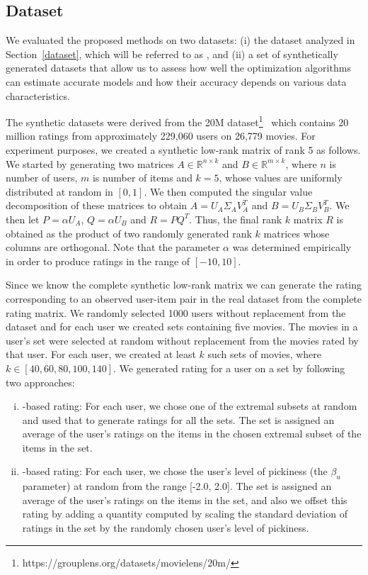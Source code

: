 
\subsection{Dataset}\label{EVALDATA}
We evaluated the proposed methods on two datasets: (i) the dataset analyzed in
Section~\ref{dataset}, which will be referred to as \MLREALSETS, and (ii) a set
of synthetically generated datasets that
allow us to assess how well
the optimization algorithms can estimate accurate models and how their
accuracy depends on various data characteristics.

The synthetic datasets were derived from the \ML
20M
dataset\footnote{https://grouplens.org/datasets/movielens/20m/}~\cite{harper2016movielens}  which
contains 20 million ratings from approximately 229,060 users on 26,779 movies.
For experiment purposes, we
created a synthetic low-rank matrix of rank 5 as follows. 
%
We started by generating two matrices
$A\in\mathbb{R}^{n\times k}$ and $B\in\mathbb{R}^{m\times k}$, where $n$ is
number of users, $m$ is number of items and $k = 5$, whose values are
uniformly distributed at random in $[0, 1]$. We then computed the singular value
decomposition of these matrices to obtain $A=U_A\Sigma_A V_A^T$ and $B=U_B\Sigma_B
V_B^T$. We then let $P=\alpha U_A$, $Q=\alpha U_B$ and $R = PQ^T$. Thus, the final
rank $k$ matrix $R$ is obtained as the product of two randomly generated rank $k$
matrices whose columns are orthogonal. Note that the parameter $\alpha$ was
determined empirically in order to produce ratings in the range of $[-10, 10]$.

Since we know the complete synthetic low-rank matrix we can generate the rating
corresponding to an observed user-item pair in the real dataset from the complete
rating matrix.
We randomly selected 1000 users without replacement from the dataset and for
each user we created sets containing five movies. 
The movies in a user's set
were selected at random without replacement from the movies rated by that user.
For each user, we created at least $k$ such sets of movies, where $k \in [40,
60, 80, 100, 140]$.
We generated rating for a user on a set by 
following two approaches: 
\begin{enumerate}[(i)]  
  \item \ES-based rating: For each user, we chose one of the
extremal subsets at random and used that to generate ratings for all the sets.
The set is assigned an average of the user's ratings on the items in the
chosen extremal subset of the items in the set. 

  \item  \VO-based rating: For each user, 
we chose the user's level of pickiness (the $\beta_u$ parameter) at random from the
range [-2.0, 2.0]. The set is assigned an average of the user's ratings on the items in the set,
and also we offset this rating by adding a quantity computed by scaling the
standard deviation of ratings in the set by the randomly chosen user's level of
pickiness.
\end{enumerate}

